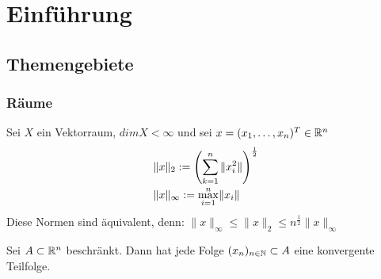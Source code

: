 \chapter*{Einf{\"u}hrung} 
  
  
  
\section{Themengebiete}



\subsection*{R{\"a}ume}


Sei $X$ ein Vektorraum, $dim X < \infty $ und sei $x = (x_{1},\dotsc,x_{n})^{T} \in \mathbb{R}^{n}$
\begin{align*}
	& \|x\|_{2} := \left(\sum_{k = 1}^{n} \|x_{i}^{2}\| \right)^{\frac{1}{2}}\\
	& \|x\|_{\infty} := \smash{\displaystyle\max_{i = 1}^{n}}  \|x_{i}\|		
\end{align*}	

Diese Normen sind äquivalent, denn:
$\| x \|_{\infty} \leq \| x \|_{2} \leq n^{\frac{1}{2}} \| x \|_{\infty}$ 

\begin{satz}  \label{satz:1.1-BolzanoWeierstrass}
Sei $A \subset \mathbb{R}^{n}$ beschränkt. Dann hat jede Folge $(x_{n})_{n \in \mathbb{N}} \subset A$ eine konvergente Teilfolge.
\end{satz}



